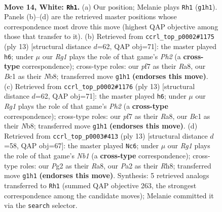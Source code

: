 \documentclass[11pt]{article}
\begin{document}
\clearpage

\begin{figure}[p]\centering
\begin{subfigure}{0.46\textwidth}\centering
\resizebox{\linewidth}{!}{%
\newchessgame
\chessboard[
  setfen={r1b1k2r/4bp2/1qn1pn2/p2p2pp/3P4/5N1P/PP3PP1/RNBQKBR1 w Qkq - 0 14},
  showmover=false,
  pgfstyle=straightmove, color=movearrow, markmove={g1-h1}
]}
\caption{}
\end{subfigure}\hfill
\begin{subfigure}{0.46\textwidth}\centering
\resizebox{\linewidth}{!}{%
\newchessgame
\chessboard[
  setfen={rnbqkb1r/1p3ppp/p2p1n2/4p3/P3P3/2N2N2/1PP2PPP/R1BQKB1R b KQkq - 1 7},
  showmover=false,
  pgfstyle=straightmove, color=movearrow, markmove={h7-h6}
]}
\caption{}
\end{subfigure}
\\[4pt]
\begin{subfigure}{0.46\textwidth}\centering
\resizebox{\linewidth}{!}{%
\newchessgame
\chessboard[
  setfen={rnbqkb1r/1p3ppp/p2p1n2/4p3/P3P3/2N2N2/1PP2PPP/R1BQKB1R b KQkq - 1 7},
  showmover=false,
  pgfstyle=straightmove, color=movearrow, markmove={h7-h6}
]}
\caption{}
\end{subfigure}\hfill
\begin{subfigure}{0.46\textwidth}\centering
\resizebox{\linewidth}{!}{%
\newchessgame
\chessboard[
  setfen={rn1qkb1r/pp3p1p/3pbnp1/2p5/2P1P3/2N2N2/PP3PPP/R1BQKB1R b KQkq - 0 7},
  showmover=false,
  pgfstyle=straightmove, color=movearrow, markmove={b8-c6}
]}
\caption{}
\end{subfigure}
\caption{\textbf{Move 14, White: \texttt{Rh1}.} (a) Our position; Melanie plays \texttt{Rh1} (\texttt{g1h1}). Panels (b)--(d) are the retrieved master positions whose correspondence most drove this move (highest QAP objective among those that transfer to it). (b) Retrieved from \texttt{ccrl\_top\_p0002\#1175} (ply 13) [structural distance $d$=62, QAP obj=71]: the master played \texttt{h6}; under $\mu$ our \emph{Rg1} plays the role of that game's \emph{Ph2} (a \textbf{cross-type} correspondence); cross-type roles: our \emph{p}f7 as their \emph{R}a8, our \emph{B}c1 as their \emph{N}b8; transferred move \texttt{g1h1} \textbf{(endorses this move)}. (c) Retrieved from \texttt{ccrl\_top\_p0002\#1176} (ply 13) [structural distance $d$=62, QAP obj=71]: the master played \texttt{h6}; under $\mu$ our \emph{Rg1} plays the role of that game's \emph{Ph2} (a \textbf{cross-type} correspondence); cross-type roles: our \emph{p}f7 as their \emph{R}a8, our \emph{B}c1 as their \emph{N}b8; transferred move \texttt{g1h1} \textbf{(endorses this move)}. (d) Retrieved from \texttt{ccrl\_top\_p0003\#413} (ply 13) [structural distance $d$=58, QAP obj=67]: the master played \texttt{Nc6}; under $\mu$ our \emph{Rg1} plays the role of that game's \emph{Nb1} (a \textbf{cross-type} correspondence); cross-type roles: our \emph{P}g2 as their \emph{R}a8, our \emph{P}a2 as their \emph{R}h8; transferred move \texttt{g1h1} \textbf{(endorses this move)}. Synthesis: 5 retrieved analogs transferred to \texttt{Rh1} (summed QAP objective 263, the strongest correspondence among the candidate moves); Melanie committed it via the \texttt{search} selector.}

\end{figure}
\end{document}
